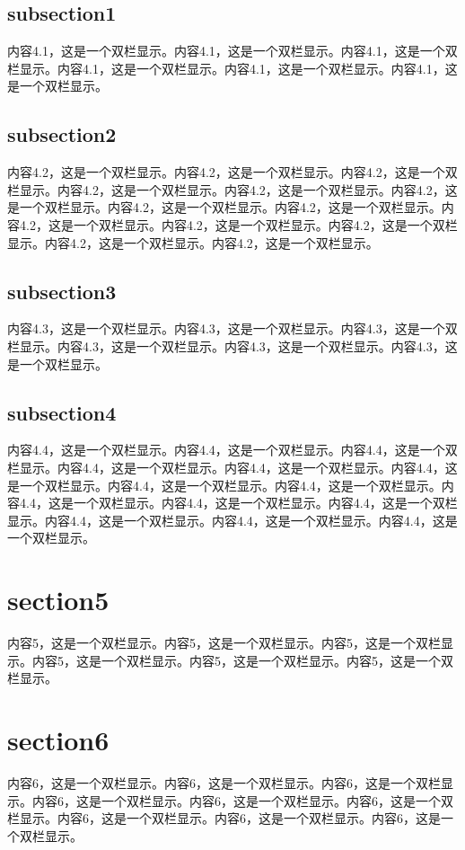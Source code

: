 \documentclass[a4pper]{article}
\begin{document}
\begin{multicols}{2}
    \subsection{subsection1}
    内容4.1，这是一个双栏显示。内容4.1，这是一个双栏显示。内容4.1，这是一个双栏显示。内容4.1，这是一个双栏显示。内容4.1，这是一个双栏显示。内容4.1，这是一个双栏显示。
    \subsection{subsection2}
    内容4.2，这是一个双栏显示。内容4.2，这是一个双栏显示。内容4.2，这是一个双栏显示。内容4.2，这是一个双栏显示。内容4.2，这是一个双栏显示。内容4.2，这是一个双栏显示。内容4.2，这是一个双栏显示。内容4.2，这是一个双栏显示。内容4.2，这是一个双栏显示。内容4.2，这是一个双栏显示。内容4.2，这是一个双栏显示。内容4.2，这是一个双栏显示。内容4.2，这是一个双栏显示。
    \subsection{subsection3}
    内容4.3，这是一个双栏显示。内容4.3，这是一个双栏显示。内容4.3，这是一个双栏显示。内容4.3，这是一个双栏显示。内容4.3，这是一个双栏显示。内容4.3，这是一个双栏显示。
    \subsection{subsection4}
    内容4.4，这是一个双栏显示。内容4.4，这是一个双栏显示。内容4.4，这是一个双栏显示。内容4.4，这是一个双栏显示。内容4.4，这是一个双栏显示。内容4.4，这是一个双栏显示。内容4.4，这是一个双栏显示。内容4.4，这是一个双栏显示。内容4.4，这是一个双栏显示。内容4.4，这是一个双栏显示。内容4.4，这是一个双栏显示。内容4.4，这是一个双栏显示。内容4.4，这是一个双栏显示。内容4.4，这是一个双栏显示。

\section{section5}
    内容5，这是一个双栏显示。内容5，这是一个双栏显示。内容5，这是一个双栏显示。内容5，这是一个双栏显示。内容5，这是一个双栏显示。内容5，这是一个双栏显示。

\section{section6}
    内容6，这是一个双栏显示。内容6，这是一个双栏显示。内容6，这是一个双栏显示。内容6，这是一个双栏显示。内容6，这是一个双栏显示。内容6，这是一个双栏显示。内容6，这是一个双栏显示。内容6，这是一个双栏显示。内容6，这是一个双栏显示。

\end{multicols}
\end{document}
